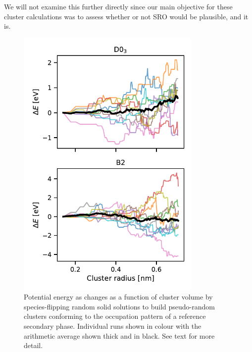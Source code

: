 We will not examine this further directly since our main objective for these cluster calculations was to assess whether or not SRO would be plausible, and it is.
%
\begin{figure}[h]
    \centering
    \includegraphics[width=0.8\textwidth]{figures/zerok_clusters}
    \caption{Potential energy as changes as a function of cluster volume by species-flipping random solid solutions to build pseudo-random clusters conforming to the occupation pattern of a reference secondary phase. Individual runs shown in colour with the arithmetic average shown thick and in black. See text for more detail.}
    \label{fig:0K_clusters}
\end{figure}
%

